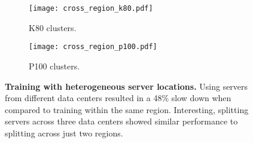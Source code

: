 


\begin{figure}[t]
%
    \begin{subfigure}{0.23\textwidth}
    \centering
    \texttt{[image: cross\_region\_k80.pdf]}
        \caption{K80 clusters.}
    \label{subfig:heter_k80} 
    \end{subfigure}
\hfill
    \begin{subfigure}{0.23\textwidth}
    \centering
    \texttt{[image: cross\_region\_p100.pdf]}
        \caption{P100 clusters.}
    \label{subfig:heter_p100} 
    \end{subfigure}
    \caption{\textbf{Training with heterogeneous server locations.}
    Using servers from different data centers 
    resulted in a 48\% slow down when compared to training within the same region. 
    Interesting, splitting servers across three data centers showed similar
    performance to splitting across just two regions.}  
    \label{fig:cross_region_train}
\end{figure}





